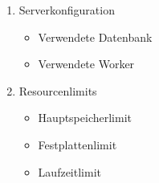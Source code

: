 \begin{enumerate}
    \item Serverkonfiguration
    \begin{itemize}
        \setlength\itemsep{-1em}
        \item Verwendete Datenbank
        \item Verwendete Worker
    \end{itemize}
    
    \item Resourcenlimits
    \begin{itemize}
        \setlength\itemsep{-1em}
        \item Hauptspeicherlimit
        \item Festplattenlimit
        \item Laufzeitlimit
    \end{itemize}
 \end{enumerate}
